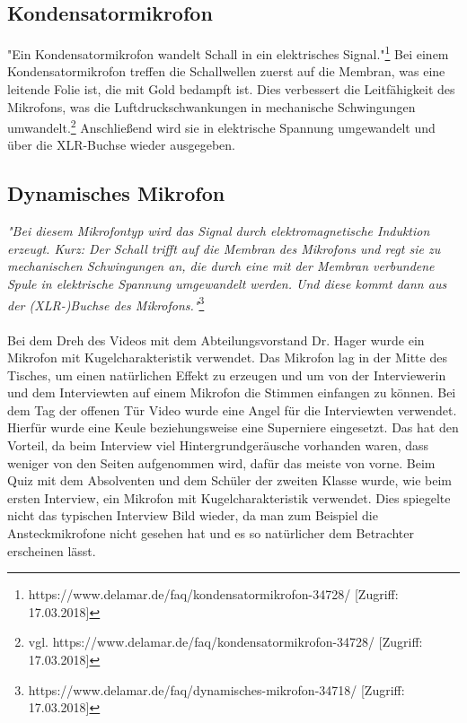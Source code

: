 \subsection{Kondensatormikrofon}
"Ein Kondensatormikrofon wandelt Schall in ein elektrisches Signal."\footnote{\label{}https://www.delamar.de/faq/kondensatormikrofon-34728/ [Zugriff: 17.03.2018]} Bei einem Kondensatormikrofon treffen die Schallwellen zuerst auf die Membran, was eine leitende Folie ist, die mit Gold bedampft ist. Dies verbessert die  Leitfähigkeit des Mikrofons, was die Luftdruckschwankungen in mechanische Schwingungen umwandelt.\footnote{\label{}vgl. https://www.delamar.de/faq/kondensatormikrofon-34728/ [Zugriff: 17.03.2018]} Anschließend wird sie in elektrische Spannung umgewandelt und über die XLR-Buchse wieder ausgegeben. 
\subsection{Dynamisches Mikrofon}
\textit{"Bei diesem Mikrofontyp wird das Signal durch elektromagnetische Induktion erzeugt. Kurz: Der Schall trifft auf die Membran des Mikrofons und regt sie zu mechanischen Schwingungen an, die durch eine mit der Membran verbundene Spule in elektrische Spannung umgewandelt werden. Und diese kommt dann aus der (XLR-)Buchse des Mikrofons."}\footnote{\label{}https://www.delamar.de/faq/dynamisches-mikrofon-34718/ [Zugriff: 17.03.2018]} \\ \\
Bei dem Dreh des Videos mit dem Abteilungsvorstand Dr. Hager wurde ein Mikrofon mit Kugelcharakteristik verwendet. Das Mikrofon lag in der Mitte des Tisches, um einen natürlichen Effekt zu erzeugen und um von der Interviewerin und dem Interviewten auf einem Mikrofon die Stimmen einfangen zu können.
Bei dem Tag der offenen Tür Video wurde eine Angel für die Interviewten verwendet. Hierfür wurde eine Keule beziehungsweise eine Superniere eingesetzt. Das hat den Vorteil, da beim Interview viel Hintergrundgeräusche vorhanden waren, dass weniger von den Seiten aufgenommen wird, dafür das meiste von vorne.
Beim Quiz mit dem Absolventen und dem Schüler der zweiten Klasse wurde, wie beim ersten Interview, ein Mikrofon mit Kugelcharakteristik verwendet. Dies spiegelte nicht das typischen Interview Bild wieder, da man zum Beispiel die Ansteckmikrofone nicht gesehen hat und es so natürlicher dem Betrachter erscheinen lässt.
